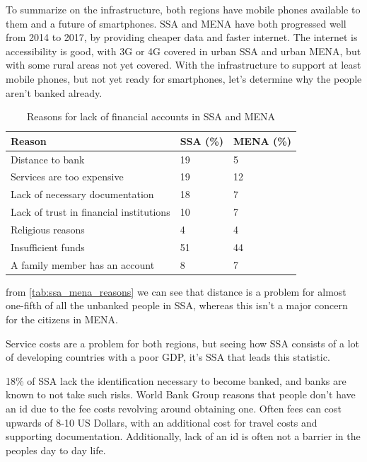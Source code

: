 \documentclass[11pt, a4paper]{article}
\begin{document}
To summarize on the infrastructure, both regions have mobile phones available to them and a future of smartphones. SSA and MENA have both progressed well from 2014 to 2017, by providing cheaper data and faster internet. The internet is accessibility is good, with 3G or 4G covered in urban SSA and urban MENA, but with some rural areas not yet covered. With the infrastructure to support at least mobile phones, but not yet ready for smartphones, let's determine why the people aren't banked already.

\begin{table}[!ht]
\centering
\begin{tabular}{|l|l|l|}
\hline
\textbf{Reason} & \textbf{SSA (\%)} & \textbf{MENA (\%)} \\ \hline
Distance to bank & 19 & 5 \\ \hline
Services are too expensive & 19 & 12 \\ \hline
Lack of necessary documentation & 18 & 7 \\ \hline
Lack of trust in financial institutions & 10 & 7 \\ \hline
Religious reasons & 4 & 4 \\ \hline
Insufficient funds & 51 & 44 \\ \hline
A family member has an account & 8 & 7\\ \hline
\end{tabular}
\caption{Reasons for lack of financial accounts in SSA and MENA\cite{gfindex}}
\label{tab:ssa_mena_reasons}
\end{table}

from \autoref{tab:ssa_mena_reasons} we can see that distance is a problem for almost one-fifth of all the unbanked people in SSA, whereas this isn't a major concern for the citizens in MENA.

Service costs are a problem for both regions, but seeing how SSA consists of a lot of developing countries with a poor GDP, it's SSA that leads this statistic.

18\% of SSA lack the identification necessary to become banked, and banks are known to not take such risks. World Bank Group\cite{worldbankid} reasons that people don't have an id due to the fee costs revolving around obtaining one. Often fees can cost upwards of 8-10 US Dollars\cite{worldbankid}, with an additional cost for travel costs and supporting documentation\cite{worldbankid}. Additionally, lack of an id is often not a barrier in the peoples day to day life\cite{worldbankid}.
\end{document}
